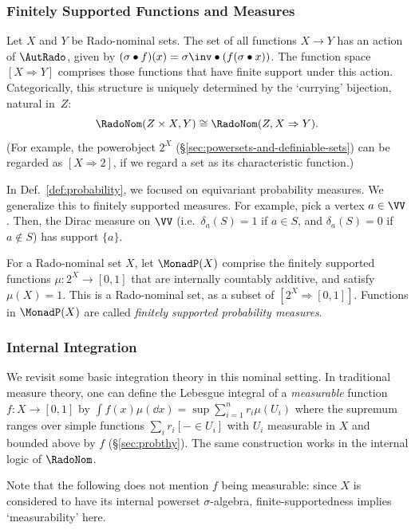 \subsubsection{Finitely Supported Functions and Measures}
Let $X$ and $Y$ be Rado-nominal sets.
The set of all functions $X\to Y$ has an action of $\AutRado$,
given by $(\sigma\bullet f)(x)=\sigma\inv\bullet (f(\sigma\bullet
x))$. The function space $[X\Rightarrow Y]$ comprises those
functions that have finite support under this action. Categorically,
this structure is uniquely determined by the `currying' bijection, natural in~$Z$:
\[
  \RadoNom(Z\times X,Y)\cong \RadoNom(Z,X\Rightarrow Y)\text .
\]
(For example, the powerobject $2^X$ (\S\ref{sec:powersets-and-definiable-sets}) can be regarded as
$[X\Rightarrow 2]$, if we regard a set as its characteristic
function.)

In Def.~\ref{def:probability}, we focused on equivariant
probability measures.
We generalize this to finitely supported measures. For example, pick a
vertex $a\in \VV$. Then, the Dirac measure on $\VV$ (i.e.~$\delta_a(S)=1$ if $a\in S$,
and $\delta_a(S)=0$ if $a\not\in S$) has support $\{a\}$.

\begin{definition}
\label{def:finitely-supported-probability-measure}
For a Rado-nominal set $X$, let $\MonadP (X)$ comprise the
    finitely supported functions $\mu : 2^X\to[0,1]$ that are
    internally countably additive, and satisfy $\mu(X) = 1$.
    This is a Rado-nominal set, as a subset of
    $[2^X\Rightarrow[0,1]]$. Functions in $\MonadP (X)$
    are called \emph{finitely supported probability measures}.
\end{definition}

\subsubsection{Internal Integration}
We revisit some basic integration theory in this nominal setting.
In traditional measure theory, one can define the Lebesgue integral of a \emph{measurable} function ${f : X \to [0,1]}$ by
$
  \int f(x) \mu(\dd x) = \sup \sum_{i = 1}^n r_i \mu(U_i)
$
where the supremum ranges over simple functions ${\sum_i r_i [- \in U_i]}$ with $U_i$ measurable in $X$ and bounded above by $f$ (\S\ref{sec:probthy}).
The same construction works in the internal logic of $\RadoNom$.

Note that the following does not mention $f$ being measurable: since $X$ is considered to have its internal powerset $\sigma$-algebra, finite-supportedness %
implies `measurability' here.

